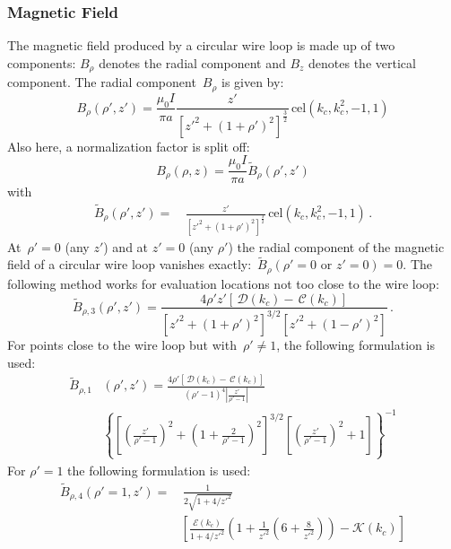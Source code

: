 \subsubsection{Magnetic Field}
The magnetic field produced by a circular wire loop is made up of two components:
$B_\rho$ denotes the radial component and $B_z$ denotes the vertical component.
The radial component~$B_\rho$ is given by:
\begin{equation}
  B_\rho(\rho', z')
  = \frac{\mu_0 I}{\pi a} \frac{z'}{\left[ z'^2 + (1 + \rho')^2 \right]^{\frac{3}{2}}} \,\mathrm{cel}(k_c, k_c^2, -1, 1)
\end{equation}
Also here, a normalization factor is split off:
\begin{equation}
  B_\rho(\rho, z) = \frac{\mu_0 I}{\pi a} \tilde{B}_\rho(\rho', z')
\end{equation}
with
\begin{align}
  \tilde{B}_\rho(\rho', z')
  =&\, \frac{z'}{\left[ z'^2 + (1 + \rho')^2 \right]^{\frac{3}{2}}} \,\mathrm{cel}(k_c, k_c^2, -1, 1) \, .
\end{align}
At~$\rho'=0$ (any $z'$) and at $z'=0$ (any $\rho'$)
the radial component of the magnetic field of a circular wire loop vanishes exactly:~$\tilde{B}_\rho(\rho'=0 \textrm{ or } z'=0) = 0$.
The following method works for evaluation locations not too close to the wire loop:
\begin{equation}
  \tilde{B}_{\rho, 3} (\rho', z')
  = \frac{4 \rho' z' \left[ \,\mathcal{D}(k_c) - \,\mathcal{C}(k_c) \right]}
         {\left[{z'}^2 + (1 + \rho')^2 \right]^{3/2} \left[{z'}^2 + (1 - \rho')^2 \right] } \, .
\end{equation}
For points close to the wire loop but with~$\rho' \neq 1$,
the following formulation is used:
\begin{align}
  \tilde{B}_{\rho, 1}& (\rho', z')
  = \frac{4 \rho' \left[ \,\mathcal{D}(k_c) - \,\mathcal{C}(k_c) \right]}
         {(\rho' - 1)^4 \left| \frac{z'}{\rho' - 1} \right|} \nonumber \\
  ~& \left\{
      \left[ \left( \frac{z'}{\rho'-1} \right)^2 + \left(1 + \frac{2}{\rho'-1} \right)^2 \right]^{3/2}
      \left[ \left( \frac{z'}{\rho'-1} \right)^2 + 1 \right]
    \right\}^{-1}
\end{align}
For $\rho'=1$ the following formulation is used:
\begin{align}
  \tilde{B}_{\rho, 4} (\rho'=1, z')
  =&\, \frac{1}{2 \sqrt{1 + 4/{z'}^2}} \nonumber \\
  ~& \left[  \frac{\mathcal{E}(k_c)}{1 + 4/{z'}^2} \left( 1 + \frac{1}{{z'}^2} \left( 6 + \frac{8}{{z'}^2} \right) \right)
            - \mathcal{K}(k_c) \right]
\end{align}
